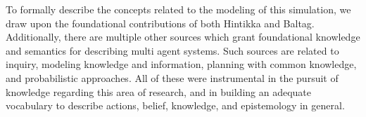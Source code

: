 To formally describe the concepts related to the modeling of this simulation, 
we draw upon the foundational contributions of both Hintikka\cite{hintikka} and 
Baltag\cite{Baltag}. Additionally, there are multiple other sources which grant 
foundational knowledge and semantics for describing multi agent systems. Such 
sources are related to inquiry\cite{delimi}, modeling knowledge and 
information\cite{modelling_multi_agent_epistemic_systems}, planning with common 
knowledge\cite{multi_agent_epistemic_planner_common_knowledge}, and 
probabilistic approaches\cite{probibalistic_multiagent_systems}. 
All of these were instrumental in the pursuit of knowledge regarding this area 
of research, and in building an adequate vocabulary to describe actions, 
belief, knowledge, and epistemology in general. 